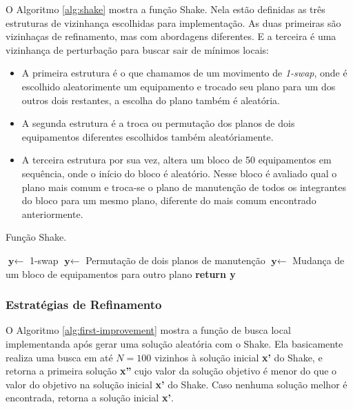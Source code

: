 \documentclass[conference]{IEEEtran}
\begin{document}
O Algoritmo \ref{alg:shake} mostra a função Shake. Nela estão definidas as três estruturas de vizinhança escolhidas para implementação. As duas primeiras
são vizinhaças de refinamento, mas com abordagens diferentes. E a terceira é uma vizinhança de perturbação para buscar sair de mínimos locais:
\begin{itemize}
	\item A primeira estrutura é o que chamamos de um movimento de \textit{1-swap}, onde é escolhido aleatorimente um equipamento e trocado seu plano para um dos outros dois
	restantes, a escolha do plano também é aleatória.
	\item A segunda estrutura é a troca ou permutação dos planos de dois equipamentos diferentes escolhidos também aleatóriamente.
	\item A terceira estrutura por sua vez, altera um bloco de 50 equipamentos em sequência, onde o início do bloco é aleatório. Nesse bloco é avaliado qual o plano mais comum
	e troca-se o plano de manutenção de todos os integrantes do bloco para um mesmo plano, diferente do mais comum encontrado anteriormente.
\end{itemize}

\begin{algorithm}[H]
	\caption{Função Shake.}\label{alg:shake}
	\begin{algorithmic}[1]
			\State $\textbf{y} \gets$ 1-swap
		\EndIf
			\State $\textbf{y} \gets$ Permutação de dois planos de manutenção
		\EndIf
			\State $\textbf{y} \gets$ Mudança de um bloco de equipamentos para outro plano
		\EndIf
	\Statex
	\State \textbf{return y} 

	\EndProcedure 
	\end{algorithmic}
\end{algorithm}

\subsubsection{Estratégias de Refinamento}

O Algoritmo \ref{alg:first-improvement} mostra a função de busca local
implementanda após gerar uma solução aleatória com o Shake. Ela basicamente 
realiza uma busca em até $N = 100$ vizinhos à solução inicial \textbf{x'} do Shake, 
e retorna a primeira 
solução \textbf{x''} cujo valor da solução objetivo é menor do que o valor do objetivo na 
solução inicial \textbf{x'} do Shake. Caso nenhuma solução melhor é encontrada, 
retorna a solução inicial \textbf{x'}.
\end{document}
